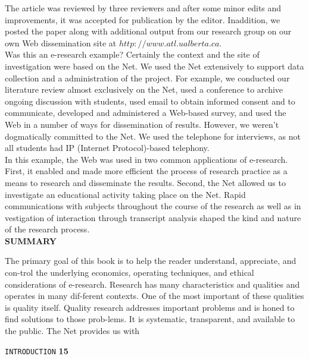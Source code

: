 \documentclass{book}
\begin{document}
 The article was reviewed by three reviewers and after some minor edits and improvements, it was accepted for publication by the editor. Inaddition, we posted the paper along with additional output from our research group on our own Web dissemination site at $http://www.atl.ualberta.ca.$\\
 \hspace*{0.4cm} Was this an e-research example? Certainly the context and the site of investigation were based on the Net. We used the Net extensively to support data collection and a administration of the project. For example, we conducted our literature review almost exclusively on the Net, used a conference to archive ongoing discussion with students, used email to obtain informed consent and to communicate, developed and administered a Web-based survey, and used the Web in a number of ways for dissemination of results. However, we weren't dogmatically committed to the Net. We used the telephone for interviews, as not all students had IP (Internet Protocol)-based telephony.\\
 In this example, the Web was used in two common applications of e-research. First, it enabled and made more efficient the process of research practice as a means to research and disseminate the results. Second, the Net allowed us to investigate an educational activity taking place on the Net. Rapid communications with subjects throughout the course of the research as well as in vestigation of interaction through transcript analysis shaped the kind and nature of the research process.\\

 \vspace*{0.6cm}
 \large{
\textbf{SUMMARY}
}

\vspace*{0.3cm}
The primary goal of this book is to help the reader understand, appreciate, and con-trol the underlying economics, operating techniques, and ethical considerations of e-research. Research has many characteristics and qualities and operates in many dif-ferent contexts. One of the most important of these qualities is quality itself. Quality research addresses important problems and is honed to find solutions to those prob-lems. It is systematic, transparent, and available to the public. The Net provides us with \\

\newpage

\begin{flushright}
 \texttt{INTRODUCTION} \hspace*{1cm} \textbf{15}
\end{flushright}
\end{document}
